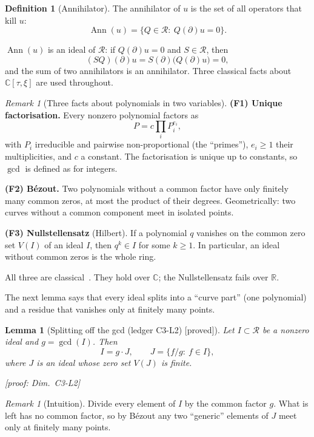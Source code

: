 \documentclass[11pt]{article}
\theoremstyle{plain}
\newtheorem{lemma}[theorem]{Lemma}
\theoremstyle{definition}
\newtheorem{definition}[theorem]{Definition}
\theoremstyle{remark}
\newtheorem{remark}[theorem]{Remark}
\newcommand{\R}{\mathbb{R}}
\newcommand{\C}{\mathbb{C}}
\newcommand{\ring}{\mathcal{R}}            %
\DeclareMathOperator{\Ann}{Ann}             %
\newcommand{\Var}{V}                        %
\DeclareMathOperator{\Gcd}{gcd}
\newcommand{\badge}[2]{\textcolor{#1}{\textsf{\footnotesize[#2]}}}
\newcommand{\proved}[1][]{\badge{cC}{proved#1}}
\newcommand{\led}[1]{\textcolor{cG}{\textsf{\footnotesize(ledger #1)}}}
\newenvironment{intuition}{\begin{remark}[Intuition]}{\end{remark}}
\newenvironment{notebox}[1]{\begin{remark}[#1]}{\end{remark}}
\newcommand{\dimref}[1]{\textsf{\footnotesize[proof: Dim.~#1]}}
\begin{document}
\begin{definition}[{Annihilator}]\label{f:def:ann}
The annihilator of $u$ is the set of all operators that kill $u$:
\[
\Ann(u)=\{Q\in\ring:\ Q(\partial)u=0\}.
\]
\end{definition}

$\Ann(u)$ is an ideal of $\ring$: if $Q(\partial)u=0$ and $S\in\ring$, then
\[
(SQ)(\partial)u=S(\partial)\big(Q(\partial)u\big)=0 ,
\]
and the sum of two annihilators is an annihilator. Three classical facts about $\C[\tau,\xi]$ are used throughout.

\begin{notebox}{Three facts about polynomials in two variables}
\textbf{(F1) Unique factorisation.} Every nonzero polynomial factors as
\[
P=c\prod_iP_i^{e_i},
\]
with $P_i$ irreducible and pairwise non-proportional (the ``primes''), $e_i\ge1$ their multiplicities, and $c$ a constant. The factorisation is unique up to constants, so $\Gcd$ is defined as for integers.

\textbf{(F2) B\'ezout.} Two polynomials without a common factor have only finitely many common zeros, at most the product of their degrees. Geometrically: two curves without a common component meet in isolated points.

\textbf{(F3) Nullstellensatz} (Hilbert). If a polynomial $q$ vanishes on the common zero set $\Var(I)$ of an ideal $I$, then $q^k\in I$ for some $k\ge1$. In particular, an ideal without common zeros is the whole ring.
\end{notebox}

All three are classical~\cite{clo,fu}. They hold over $\C$; the Nullstellensatz fails over $\R$.

The next lemma says that every ideal splits into a ``curve part'' (one polynomial) and a residue that vanishes only at finitely many points.

\begin{lemma}[{Splitting off the gcd \led{C3-L2} \proved}]\label{f:lem:gcd}
Let $I\subset\ring$ be a nonzero ideal and $g=\Gcd(I)$. Then
\[
I=g\cdot J,\qquad J=\{f/g:\ f\in I\},
\]
where $J$ is an ideal whose zero set $\Var(J)$ is finite.

\dimref{C3-L2}
\end{lemma}

\begin{intuition}
Divide every element of $I$ by the common factor $g$. What is left has no common factor, so by B\'ezout any two ``generic'' elements of $J$ meet only at finitely many points.
\end{intuition}
\end{document}
